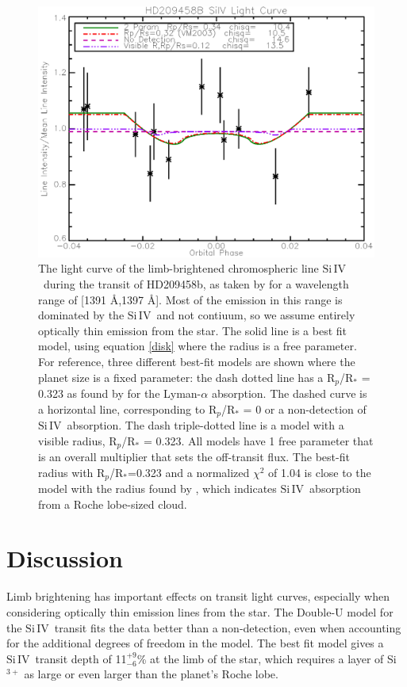 \documentclass[manuscript]{aastex}
\newcommand{\siIV}{\ensuremath{\mathrm{Si}\,\scriptstyle \mathrm{IV}}}
\begin{document}
\begin{figure}[!ht]
\begin{center}
\includegraphics[width=0.5 \textwidth]{hd209458.eps}
\caption{The light curve of the limb-brightened chromospheric line \siIV\ during the transit of HD209458b, as taken by \citet{vidmad} for a wavelength range of [1391 \AA,1397 \AA]. Most of the emission in this range is dominated by the \siIV\ and not contiuum, so we assume entirely optically thin emission from the star. The solid line is a best fit model, using equation \ref{disk} where the radius is a free parameter. For reference, three different best-fit models are shown where the planet size is a fixed parameter: the dash dotted line has a R$_p$/R$_*$ = 0.323 as found by \citet{vidmad} for the Lyman-$\alpha$ absorption. The dashed curve is a horizontal line, corresponding to R$_p$/R$_*$ = 0 or a non-detection of \siIV\ absorption. The dash triple-dotted line is a model with a visible radius, R$_p$/R$_*$ = 0.323. All models have 1 free parameter that is an overall multiplier that sets the off-transit flux. The best-fit radius with R$_p$/R$_*$=0.323 and a normalized $\chi^2$ of 1.04 is close to the model with the radius found by \citet{vidmad}, which indicates \siIV\ absorption from a Roche lobe-sized cloud. }
\end{center}
\label{lightc}
\end{figure}

\section{Discussion} \label{discuss}

Limb brightening has important effects on transit light curves, especially when considering optically thin emission lines from the star. The Double-U model for the \siIV\ transit fits the data better than a non-detection, even when accounting for the additional degrees of freedom in the model. The best fit model gives a \siIV\ transit depth of 11$^{+9}_{-6}$\% at the limb  of the star, which requires a layer of Si$^{3+}$ as large or even larger than the planet's Roche lobe.
\end{document}
